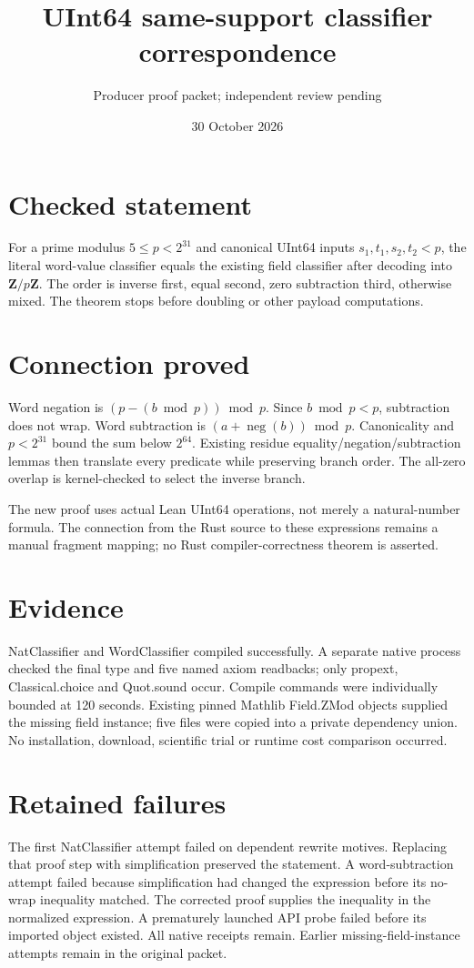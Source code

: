 \documentclass[10pt]{article}
\begin{document}
\title{UInt64 same-support classifier correspondence}
\author{Producer proof packet; independent review pending}
\date{30 October 2026}\maketitle
\section*{Checked statement}
For a prime modulus $5\le p<2^{31}$ and canonical UInt64 inputs $s_1,t_1,s_2,t_2<p$, the literal word-value classifier equals the existing field classifier after decoding into $\mathbf Z/p\mathbf Z$. The order is inverse first, equal second, zero subtraction third, otherwise mixed. The theorem stops before doubling or other payload computations.
\section*{Connection proved}
Word negation is $(p-(b\bmod p))\bmod p$. Since $b\bmod p<p$, subtraction does not wrap. Word subtraction is $(a+\operatorname{neg}(b))\bmod p$. Canonicality and $p<2^{31}$ bound the sum below $2^{64}$. Existing residue equality/negation/subtraction lemmas then translate every predicate while preserving branch order. The all-zero overlap is kernel-checked to select the inverse branch.

The new proof uses actual Lean UInt64 operations, not merely a natural-number formula. The connection from the Rust source to these expressions remains a manual fragment mapping; no Rust compiler-correctness theorem is asserted.
\section*{Evidence}
NatClassifier and WordClassifier compiled successfully. A separate native process checked the final type and five named axiom readbacks; only propext, Classical.choice and Quot.sound occur. Compile commands were individually bounded at 120 seconds. Existing pinned Mathlib Field.ZMod objects supplied the missing field instance; five files were copied into a private dependency union. No installation, download, scientific trial or runtime cost comparison occurred.
\section*{Retained failures}
The first NatClassifier attempt failed on dependent rewrite motives. Replacing that proof step with simplification preserved the statement. A word-subtraction attempt failed because simplification had changed the expression before its no-wrap inequality matched. The corrected proof supplies the inequality in the normalized expression. A prematurely launched API probe failed before its imported object existed. All native receipts remain. Earlier missing-field-instance attempts remain in the original packet.
\end{document}
